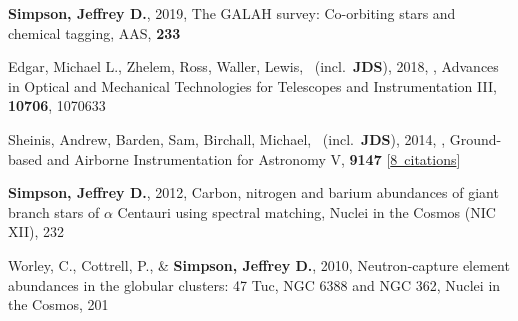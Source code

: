 \item[{\color{numcolor}\scriptsize5}] \textbf{Simpson, Jeffrey D.}, 2019, The GALAH survey: Co-orbiting stars and chemical tagging, AAS, \textbf{233}

\item[{\color{numcolor}\scriptsize4}] Edgar, Michael L., Zhelem, Ross, Waller, Lewis, \etal\ (incl.\ \textbf{JDS}), 2018, , Advances in Optical and Mechanical Technologies for Telescopes and Instrumentation III, \textbf{10706}, 1070633

\item[{\color{numcolor}\scriptsize3}] Sheinis, Andrew, Barden, Sam, Birchall, Michael, \etal\ (incl.\ \textbf{JDS}), 2014, , Ground-based and Airborne Instrumentation for Astronomy V, \textbf{9147} [\href{https://ui.adsabs.harvard.edu/#abs/2014SPIE.9147E..0YS}{8~citations}]

\item[{\color{numcolor}\scriptsize2}] \textbf{Simpson, Jeffrey D.}, 2012, Carbon, nitrogen and barium abundances of giant branch stars of {\ensuremath{\alpha}} Centauri using spectral matching, Nuclei in the Cosmos (NIC XII), 232

\item[{\color{numcolor}\scriptsize1}] Worley, C., Cottrell, P., \& \textbf{Simpson, Jeffrey D.}, 2010, Neutron-capture element abundances in the globular clusters: 47 Tuc, NGC 6388 and NGC 362, Nuclei in the Cosmos, 201